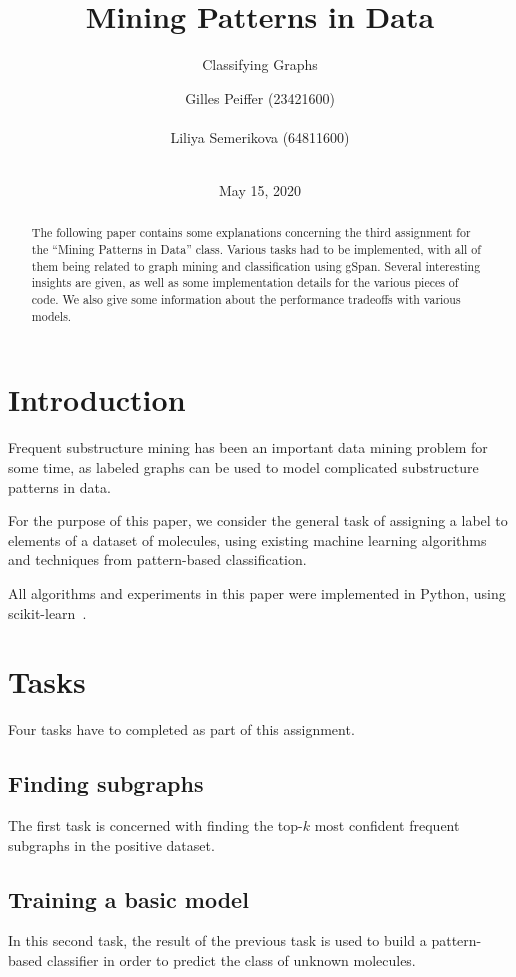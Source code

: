 \documentclass{sigkddExp}
\title{Mining Patterns in Data}
\subtitle{Classifying Graphs}
\author{
\alignauthor Gilles Peiffer (23421600)\\
	\affaddr{Université catholique de Louvain}\\
	\email{gilles.peiffer@student.uclouvain.be}
\alignauthor Liliya Semerikova (64811600)\\
	\affaddr{Université catholique de Louvain}\\
	\email{liliya.semerikova@student.uclouvain.be}}
\date{May 15, 2020}
\newcommand{\gspan}{\textsf{gSpan}}
\begin{document}
\maketitle

\begin{abstract}
	The following paper contains some explanations concerning the third assignment for the ``Mining Patterns in Data'' class.
	Various tasks had to be implemented, with all of them being related to graph mining and classification using \gspan.
	Several interesting insights are given, as well as some implementation details for the various pieces of code.
	We also give some information about the performance tradeoffs with various models.
\end{abstract}

\section{Introduction}
Frequent substructure mining has been an important data mining problem for some time, as labeled graphs can be used to model complicated substructure patterns in data.

For the purpose of this paper, we consider the general task of assigning a label to elements of a dataset of molecules, using existing machine learning algorithms and techniques from pattern-based classification.

All algorithms and experiments in this paper were implemented in Python, using scikit-learn~\cite{sklearn}.

\section{Tasks}
\label{sec:tasks}
Four tasks have to completed as part of this assignment.

\subsection{Finding subgraphs}
The first task is concerned with finding the top-\(k\) most confident frequent subgraphs in the positive dataset.

\subsection{Training a basic model}
In this second task, the result of the previous task is used to build a pattern-based classifier in order to predict the class of unknown molecules.
\end{document}
